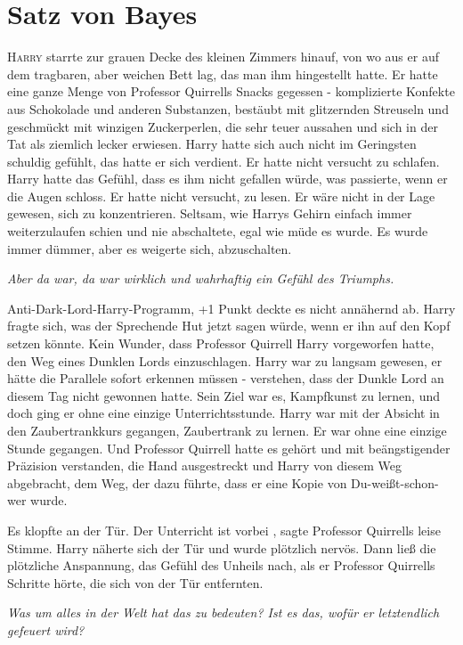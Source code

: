 \chapter{Satz von Bayes}

\lettrine{H}{arry} starrte zur grauen Decke des kleinen Zimmers hinauf, von wo aus er auf dem
tragbaren, aber weichen Bett lag, das man ihm hingestellt hatte. Er hatte eine
ganze Menge von Professor Quirrells Snacks gegessen - komplizierte Konfekte aus
Schokolade und anderen Substanzen, bestäubt mit glitzernden Streuseln und
geschmückt mit winzigen Zuckerperlen, die sehr teuer aussahen und sich in der
Tat als ziemlich lecker erwiesen. Harry hatte sich auch nicht im Geringsten
schuldig gefühlt, das hatte er sich verdient. Er hatte nicht versucht zu
schlafen. Harry hatte das Gefühl, dass es ihm nicht gefallen würde, was
passierte, wenn er die Augen schloss. Er hatte nicht versucht, zu lesen. Er wäre
nicht in der Lage gewesen, sich zu konzentrieren. Seltsam, wie Harrys Gehirn
einfach immer weiterzulaufen schien und nie abschaltete, egal wie müde es wurde.
Es wurde immer dümmer, aber es weigerte sich, abzuschalten.

\emph{Aber da war, da war wirklich und wahrhaftig ein Gefühl des Triumphs.}

Anti-Dark-Lord-Harry-Programm, +1 Punkt deckte es nicht annähernd ab. Harry
fragte sich, was der Sprechende Hut jetzt sagen würde, wenn er ihn auf den Kopf
setzen könnte. Kein Wunder, dass Professor Quirrell Harry vorgeworfen hatte, den
Weg eines Dunklen Lords einzuschlagen. Harry war zu langsam gewesen, er hätte
die Parallele sofort erkennen müssen - verstehen, dass der Dunkle Lord an diesem
Tag nicht gewonnen hatte. Sein Ziel war es, Kampfkunst zu lernen, und doch ging
er ohne eine einzige Unterrichtsstunde. Harry war mit der Absicht in den
Zaubertrankkurs gegangen, Zaubertrank zu lernen. Er war ohne eine einzige Stunde
gegangen. Und Professor Quirrell hatte es gehört und mit beängstigender
Präzision verstanden, die Hand ausgestreckt und Harry von diesem Weg abgebracht,
dem Weg, der dazu führte, dass er eine Kopie von Du-weißt-schon-wer wurde.

Es klopfte an der Tür. \glqq Der Unterricht ist vorbei\grqq{} , sagte Professor
Quirrells leise Stimme. Harry näherte sich der Tür und wurde plötzlich nervös.
Dann ließ die plötzliche Anspannung, das Gefühl des Unheils nach, als er
Professor Quirrells Schritte hörte, die sich von der Tür entfernten.

\emph{Was um alles in der Welt hat das zu bedeuten? Ist es das, wofür er
letztendlich gefeuert wird? }

